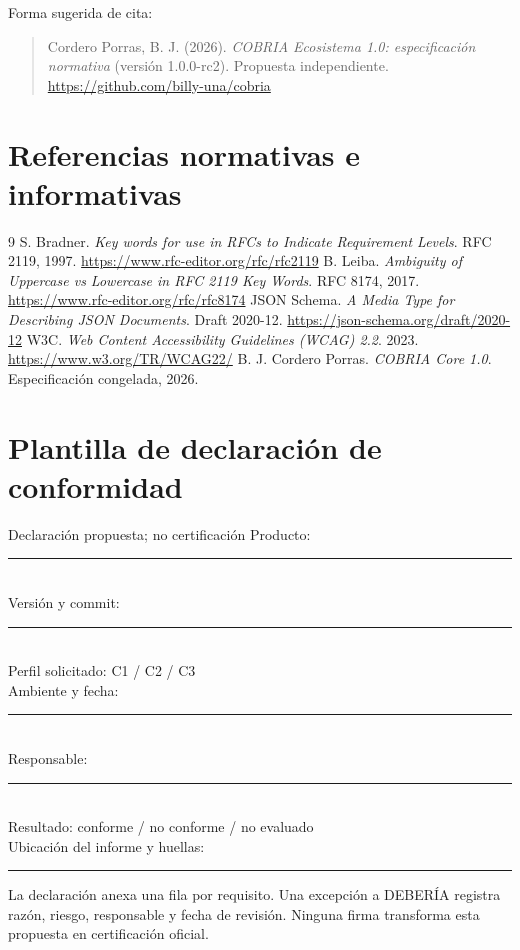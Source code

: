 \documentclass[11pt,letterpaper]{article}
\begin{document}
Forma sugerida de cita:
\begin{quote}
Cordero Porras, B. J. (2026). \emph{COBRIA Ecosistema 1.0: especificación normativa}
(versión 1.0.0-rc2). Propuesta independiente. \url{https://github.com/billy-una/cobria}
\end{quote}

\section{Referencias normativas e informativas}
\begin{thebibliography}{9}
 S. Bradner. \emph{Key words for use in RFCs to Indicate Requirement Levels}. RFC 2119, 1997. \url{https://www.rfc-editor.org/rfc/rfc2119}
 B. Leiba. \emph{Ambiguity of Uppercase vs Lowercase in RFC 2119 Key Words}. RFC 8174, 2017. \url{https://www.rfc-editor.org/rfc/rfc8174}
 JSON Schema. \emph{A Media Type for Describing JSON Documents}. Draft 2020-12. \url{https://json-schema.org/draft/2020-12}
 W3C. \emph{Web Content Accessibility Guidelines (WCAG) 2.2}. 2023. \url{https://www.w3.org/TR/WCAG22/}
 B. J. Cordero Porras. \emph{COBRIA Core 1.0}. Especificación congelada, 2026.
\end{thebibliography}

\appendix
\section{Plantilla de declaración de conformidad}
\begin{aviso}{Declaración propuesta; no certificación}
Producto: \rule{9cm}{.3pt}\\
Versión y commit: \rule{7.6cm}{.3pt}\\
Perfil solicitado: C1 / C2 / C3\\
Ambiente y fecha: \rule{7.7cm}{.3pt}\\
Responsable: \rule{9cm}{.3pt}\\
Resultado: conforme / no conforme / no evaluado\\
Ubicación del informe y huellas: \rule{5.1cm}{.3pt}
\end{aviso}
La declaración anexa una fila por requisito. Una excepción a DEBERÍA registra razón,
riesgo, responsable y fecha de revisión. Ninguna firma transforma esta propuesta en
certificación oficial.
\end{document}
